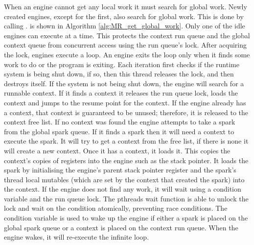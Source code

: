 When an engine cannot get any local work it must search for global work.
Newly created engines, except for the first, also search for global work.
This is done by calling \getglobalwork.
\getglobalwork is shown in Algorithm \ref{alg:MR_get_global_work}.
Only one of the idle engines can execute \getglobalwork at a time.
This protects the context run queue and the global context queue from
concurrent access using the run queue's lock.
After acquiring the lock, 
engines execute a loop.
An engine exits the loop only when it finds some work to do or the
program is exiting.
Each iteration first checks if the runtime system is being shut down,
if so,
then this thread releases the lock,
and then destroys itself.
If the system is not being shut down,
the engine will search for a runnable context.
If it finds a context it releases the run queue lock, loads the context
and jumps to the resume point for the context.
If the engine already has a context,
that context is guaranteed to be unused;
therefore, it is released to the context free list.
If no context was found the engine attempts to take a spark from the global
spark queue.
If it finds a spark then it will need a context to execute the spark.
It will try to get a context from the free list, if there is none it will
create a new context.
Once it has a context,
it loads it.
This copies the context's copies of registers into the engine such as the
stack pointer.
It loads the spark by initialising the engine's parent stack pointer
register and the spark's thread local mutables
(which are set by the context that created the spark)
into the context.
If the engine does not find any work,
it will wait using a condition variable and the run queue lock.
The pthreads wait function is able to unlock the lock and wait on the
condition atomically, preventing race conditions. 
The condition variable is used to wake up the engine if either a spark is
placed on the global spark queue or a context is placed on the context run
queue.
When the engine wakes,
it will re-execute the infinite loop.


